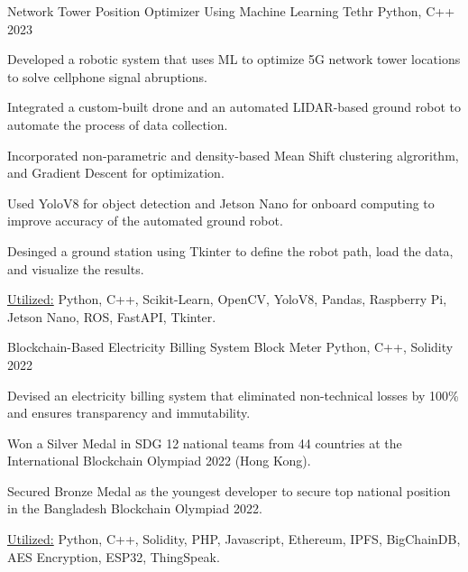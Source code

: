 

\begin{cventries}

  \cventryprojects
    {Network Tower Position Optimizer Using Machine Learning} %
    {Tethr} %
    {Python, C++} %
    {2023} %
    {
      \begin{cvitems} %
        \item {Developed a robotic system that uses ML to optimize 5G network tower locations 
        to solve cellphone signal abruptions.}
        \item {Integrated a custom-built drone and an automated LIDAR-based ground robot to automate the process of 
        data collection.}
        \item {Incorporated non-parametric and density-based Mean Shift clustering algrorithm, and Gradient Descent 
        for optimization.}
        \item {Used YoloV8 for object detection and Jetson Nano for onboard computing to improve accuracy of the automated 
        ground robot.}
        \item {Desinged a ground station using Tkinter to define the robot path, load the data, and visualize the results.}
        \item {\underline{Utilized:} Python, C++, Scikit-Learn, OpenCV, YoloV8, Pandas, Raspberry Pi, Jetson Nano, ROS, FastAPI, Tkinter.}
      \end{cvitems}
      }
      
      \cventryprojects
      {Blockchain-Based Electricity Billing System } %
      {Block Meter} %
      {Python, C++, Solidity} %
      {2022} %
      {
        \begin{cvitems} %
          \item {Devised an electricity billing system that eliminated non-technical losses by 100\% and ensures transparency and immutability.}
          \item {Won a Silver Medal in SDG 12 national teams from 44 countries at the International Blockchain Olympiad 2022 (Hong Kong).}
          \item {Secured Bronze Medal as the youngest developer to secure top national position in the Bangladesh Blockchain Olympiad 2022.}
          \item {\underline{Utilized:} Python, C++, Solidity, PHP, Javascript, Ethereum, IPFS, BigChainDB, AES Encryption, ESP32, ThingSpeak.}
        \end{cvitems}
        }
      

\end{cventries}
